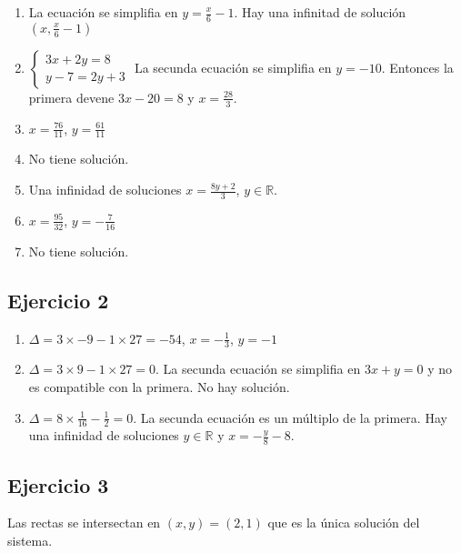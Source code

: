 \begin{enumerate}
\item La ecuación se simplifia en $y = \frac{x}{6} - 1$. Hay una infinitad de
  solución ${(x, \frac{x}{6} - 1)}$
\item $\left\{\begin{aligned}
  3x + 2y = 8 \\
  y - 7 = 2y + 3
\end{aligned}\right.$ La secunda ecuación se simplifia en $y = -10$.
  Entonces la primera devene $3x - 20 = 8$ y $x = \frac{28}{3}$.
\item $x = \frac{76}{11}$, $y = \frac{61}{11}$
\item No tiene solución.
\item Una infinidad de soluciones $x=\frac{8y+2}{3}$, $y \in {\mathbb R}$.
\item $x = \frac{95}{32}$, $y = -\frac{7}{16}$
\item No tiene solución.
\end{enumerate}

\subsection*{Ejercicio 2}

\begin{enumerate}
\item $\Delta = 3 \times -9 - 1 \times 27 = -54$, $x=-\frac{1}{3}$,
  $y = -1$
\item $\Delta = 3 \times 9 - 1 \times 27 = 0$. La secunda ecuación
  se simplifia en $3x+y=0$ y no es compatible con la primera. No hay solución.
\item $\Delta = 8 \times \frac{1}{16} - \frac{1}{2} = 0$. La secunda ecuación
  es un múltiplo de la primera. Hay una infinidad de soluciones
  $y \in \mathbb R$ y $x = -\frac{y}{8} - 8$.
\end{enumerate}

\subsection*{Ejercicio 3}

Las rectas se intersectan en ${(x,y)}={(2,1)}$ que es la única solución del
sistema.

\begin{center}
\end{center}


